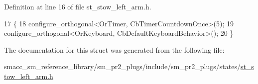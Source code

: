 Definition at line 16 of file st\+\_\+stow\+\_\+left\+\_\+arm.\+h.


\begin{DoxyCode}
17     \{
18         configure\_orthogonal<OrTimer,  CbTimerCountdownOnce>(5);    
19         configure\_orthogonal<OrKeyboard, CbDefaultKeyboardBehavior>();
20     \}
\end{DoxyCode}


The documentation for this struct was generated from the following file\+:\begin{DoxyCompactItemize}
\item 
smacc\+\_\+sm\+\_\+reference\+\_\+library/sm\+\_\+pr2\+\_\+plugs/include/sm\+\_\+pr2\+\_\+plugs/states/\hyperlink{st__stow__left__arm_8h}{st\+\_\+stow\+\_\+left\+\_\+arm.\+h}\end{DoxyCompactItemize}
